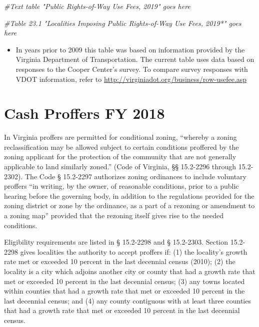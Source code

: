 \documentclass[
]{book}
\newenvironment{Shaded}{\begin{snugshade}}{\end{snugshade}}
\newcommand{\CommentTok}[1]{\textcolor[rgb]{0.56,0.35,0.01}{\textit{#1}}}
\providecommand{\tightlist}{%
  \setlength{\itemsep}{0pt}\setlength{\parskip}{0pt}}
\begin{document}
\begin{Shaded}
\begin{Highlighting}[]
\CommentTok{\#Text table "Public Rights{-}of{-}Way Use Fees, 2019" goes here}

\CommentTok{\#Table 23.1 "Localities Imposing Public Rights{-}of{-}Way Use Fees, 2019*" goes here}
\end{Highlighting}
\end{Shaded}

\begin{itemize}
\tightlist
\item
  In years prior to 2009 this table was based on information provided by the Virginia Department of Transportation. The current table uses data based on responses to the Cooper Center's survey. To compare survey responses with VDOT information, refer to \url{http://virginiadot.org/business/row-usefee.asp}
\end{itemize}

\hypertarget{cash-proffers-fy-2018}{%
\chapter{Cash Proffers FY 2018}\label{cash-proffers-fy-2018}}

In Virginia proffers are permitted for conditional zoning, ``whereby a zoning reclassification may be allowed subject to certain conditions proffered by the zoning applicant for the protection of the community that are not generally applicable to land similarly zoned.'' (Code of Virginia, §§ 15.2-2296 through 15.2-2302). The Code § 15.2-2297 authorizes zoning ordinances to include voluntary proffers ``in writing, by the owner, of reasonable conditions, prior to a public hearing before the governing body, in addition to the regulations provided for the zoning district or zone by the ordinance, as a part of a rezoning or amendment to a zoning map'' provided that the rezoning itself gives rise to the needed conditions.

Eligibility requirements are listed in § 15.2-2298 and § 15.2-2303. Section 15.2-2298 gives localities the authority to accept proffers if: (1) the locality's growth rate met or exceeded 10 percent in the last decennial census (2010); (2) the locality is a city which adjoins another city or county that had a growth rate that met or exceeded 10 percent in the last decennial census; (3) any towns located within counties that had a growth rate that met or exceeded 10 percent in the last decennial census; and (4) any county contiguous with at least three counties that had a growth rate that met or exceeded 10 percent in the last decennial census.
\end{document}
